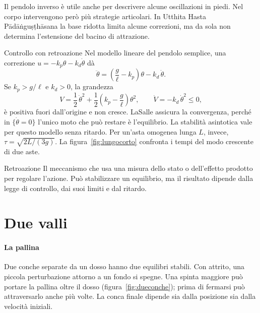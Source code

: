 \documentclass[11pt]{article}
\begin{document}
Il pendolo inverso è utile anche per descrivere alcune oscillazioni in piedi. Nel corpo intervengono però più strategie articolari. In Utthita Hasta Pādāṅguṣṭhāsana la base ridotta limita alcune correzioni, ma da sola non determina l'estensione del bacino di attrazione.

\begin{formule}{Controllo con retroazione}
Nel modello lineare del pendolo semplice, una correzione $u=-k_p\theta-k_d\dot{\theta}$ dà
\[
\ddot{\theta}=\left(\frac{g}{\ell}-k_p\right)\theta-k_d\,\dot{\theta} .
\]
Se $k_p>g/\ell$ e $k_d>0$, la grandezza
\[
V=\frac{1}{2}\,\dot{\theta}^{2}+\frac{1}{2}\left(k_p-\frac{g}{\ell}\right)\theta^{2},
\qquad
\dot V=-k_d\,\dot{\theta}^{2}\le 0 ,
\]
è positiva fuori dall'origine e non cresce. LaSalle assicura la convergenza, perché in $\{\dot{\theta}=0\}$ l'unico moto che può restare è l'equilibrio. La stabilità asintotica vale per questo modello senza ritardo. Per un'asta omogenea lunga $L$, invece, $\tau=\sqrt{2L/(3g)}$. La figura~\ref{fig:lungocorto} confronta i tempi del modo crescente di due aste.
\end{formule}

\begin{parola}{Retroazione}
Il meccanismo che usa una misura dello stato o dell'effetto prodotto per regolare l'azione. Può stabilizzare un equilibrio, ma il risultato dipende dalla legge di controllo, dai suoi limiti e dal ritardo.
\end{parola}

\section{Due valli}\label{sec:valli}

\paragraph{La pallina} Due conche separate da un dosso hanno due equilibri stabili. Con attrito, una piccola perturbazione attorno a un fondo si spegne. Una spinta maggiore può portare la pallina oltre il dosso (figura~\ref{fig:dueconche}); prima di fermarsi può attraversarlo anche più volte. La conca finale dipende sia dalla posizione sia dalla velocità iniziali.
\end{document}
